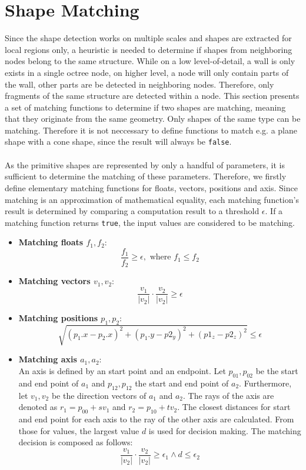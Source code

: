 \section{Shape Matching}
\label{sec:shapeMatching}
Since the shape detection works on multiple scales and shapes are extracted for local regions only, a heuristic is needed to determine if shapes from neighboring nodes belong to the same structure. While on a low level-of-detail, a wall is only exists in a single octree node, on higher level, a node will only contain parts of the wall, other parts are be detected in neighboring nodes. Therefore, only fragments of the same structure are detected within a node. This section presents a set of matching functions to determine if two shapes are matching, meaning that they originate from the same geometry. Only shapes of the same type can be matching. Therefore it is not neccessary to define functions to match e.g. a plane shape with a cone shape, since the result will always be \verb|false|. 
\\
\\
As the primitive shapes are represented by only a handful of parameters, it is sufficient to determine the matching of these parameters.  Therefore, we firstly define elementary matching functions for floats, vectors, positions and axis. Since matching is an approximation of mathematical equality, each matching function's result is determined by comparing a computation result to a threshold $\epsilon$. If a matching function returns \verb|true|, the input values are considered to be matching. 

\begin{itemize}
	\item \textbf{Matching floats $f_1, f_2$}: 
		$$\frac{f_1}{f_2} \geq \epsilon, \textrm{ where } f_1 \leq f_2$$  
	\item \textbf{Matching vectors $v_1, v_2$}: 
		$$\frac{v_1}{|v_2|} \cdot \frac{v_2}{|v_2|} \geq \epsilon$$
	\item \textbf{Matching positions $p_1, p_2$}: 
		$$\sqrt{(p_1.x - p_2.x)^2 + (p_1.y - p2_y)^2 + (p1_z - p2_z)^2} \leq \epsilon$$
	\item \textbf{Matching axis $a_1, a_2$}: 
	\\
	An axis is defined by an start point and an endpoint. Let $p_{01},p_{02}$ be the start and end point of $a_1$ and $p_{12}, p_{12}$ the start and end point of $a_2$. Furthermore, let $v_1, v_2$ be the direction vectors of $a_1$ and $a_2$. The rays of the axis are denoted as $r_1 = p_{00} + sv_1$ and $r_2 = p_{10} + tv_2$. The closest distances for start and end point for each axis to the ray of the other axis are calculated. From those for values, the largest value $d$ is used for decision making. The matching decision is composed as follows: 
		$$\frac{v_1}{|v_2|} \cdot \frac{v_2}{|v_2|} \geq \epsilon_1 \land d \leq \epsilon_2$$
\end{itemize}


